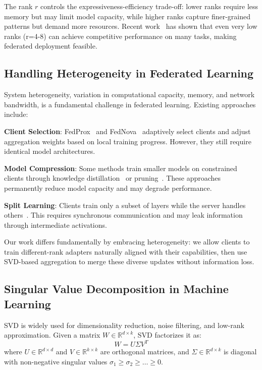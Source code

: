 \documentclass[conference]{IEEEtran}
\begin{document}
The rank $r$ controls the expressiveness-efficiency trade-off: lower ranks require less memory but may limit model capacity, while higher ranks capture finer-grained patterns but demand more resources. Recent work~\cite{dettmers2024qlora} has shown that even very low ranks (r=4-8) can achieve competitive performance on many tasks, making federated deployment feasible.

\subsection{Handling Heterogeneity in Federated Learning}

System heterogeneity, variation in computational capacity, memory, and network bandwidth, is a fundamental challenge in federated learning. Existing approaches include:

\textbf{Client Selection}: FedProx~\cite{li2020fedprox} and FedNova~\cite{wang2020fednova} adaptively select clients and adjust aggregation weights based on local training progress. However, they still require identical model architectures.

\textbf{Model Compression}: Some methods train smaller models on constrained clients through knowledge distillation~\cite{zhang2022fedkd} or pruning~\cite{jiang2022fedprune}. These approaches permanently reduce model capacity and may degrade performance.

\textbf{Split Learning}: Clients train only a subset of layers while the server handles others~\cite{gupta2018split}. This requires synchronous communication and may leak information through intermediate activations.

Our work differs fundamentally by embracing heterogeneity: we allow clients to train different-rank adapters naturally aligned with their capabilities, then use SVD-based aggregation to merge these diverse updates without information loss.

\subsection{Singular Value Decomposition in Machine Learning}

SVD is widely used for dimensionality reduction, noise filtering, and low-rank approximation. Given a matrix $W \in \mathbb{R}^{d \times k}$, SVD factorizes it as:
\begin{equation}
W = U \Sigma V^T
\end{equation}
where $U \in \mathbb{R}^{d \times d}$ and $V \in \mathbb{R}^{k \times k}$ are orthogonal matrices, and $\Sigma \in \mathbb{R}^{d \times k}$ is diagonal with non-negative singular values $\sigma_1 \geq \sigma_2 \geq \ldots \geq 0$.
\end{document}
